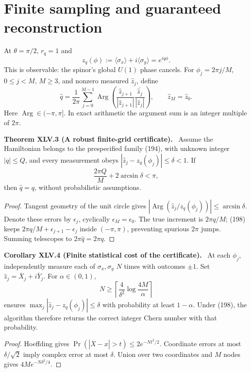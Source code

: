 \documentclass[11pt,a4paper,oneside]{book}
\newcommand{\statement}[3]{\par\medskip\noindent\textbf{#1 #2 (#3).}\ }
\begin{document}
\section{Finite sampling and guaranteed reconstruction}
At $\theta=\pi/2$, $r_q=1$ and
\begin{equation}z_q(\phi):=\langle\sigma_x\rangle+i\langle\sigma_y\rangle=e^{iq\phi}.\tag{196}\end{equation}
This is observable: the spinor's global $U(1)$ phase cancels. For $\phi_j=2\pi j/M$, $0\le j<M$, $M\ge3$, and nonzero measured $\widehat z_j$, define
\begin{equation}\widehat q=\frac1{2\pi}\sum_{j=0}^{M-1}\operatorname{Arg}\left(\frac{\widehat z_{j+1}}{|\widehat z_{j+1}|}\frac{\overline{\widehat z_j}}{|\widehat z_j|}\right),\qquad\widehat z_M=\widehat z_0.\tag{197}\end{equation}
Here $\operatorname{Arg}\in(-\pi,\pi]$. In exact arithmetic the argument sum is an integer multiple of $2\pi$.
\statement{Theorem}{XLV.3}{A robust finite-grid certificate}
Assume the Hamiltonian belongs to the prespecified family (194), with unknown integer $|q|\le Q$, and every measurement obeys $|\widehat z_j-z_q(\phi_j)|\le\delta<1$. If
\begin{equation}\frac{2\pi Q}{M}+2\arcsin\delta<\pi,\tag{198}\end{equation}
then $\widehat q=q$, without probabilistic assumptions.
\begin{proof}
Tangent geometry of the unit circle gives $|\operatorname{Arg}(\widehat z_j/z_q(\phi_j))|\le\arcsin\delta$. Denote these errors by $\epsilon_j$, cyclically $\epsilon_M=\epsilon_0$. The true increment is $2\pi q/M$; (198) keeps $2\pi q/M+\epsilon_{j+1}-\epsilon_j$ inside $(-\pi,\pi)$, preventing spurious $2\pi$ jumps. Summing telescopes to $2\pi\widehat q=2\pi q$.
\end{proof}
\statement{Corollary}{XLV.4}{Finite statistical cost of the certificate}
At each $\phi_j$, independently measure each of $\sigma_x,\sigma_y$ $N$ times with outcomes $\pm1$. Set $\widehat z_j=\overline X_j+i\overline Y_j$. For $\alpha\in(0,1)$,
\begin{equation}N\ge\left\lceil\frac4{\delta^2}\log\frac{4M}{\alpha}\right\rceil\tag{199}\end{equation}
ensures $\max_j|\widehat z_j-z_q(\phi_j)|\le\delta$ with probability at least $1-\alpha$. Under (198), the algorithm therefore returns the correct integer Chern number with that probability.
\begin{proof}
Hoeffding gives $\Pr(|\overline X-x|>t)\le2e^{-Nt^2/2}$. Coordinate errors at most $\delta/\sqrt2$ imply complex error at most $\delta$. Union over two coordinates and $M$ nodes gives $4Me^{-N\delta^2/4}$.
\end{proof}
\end{document}
